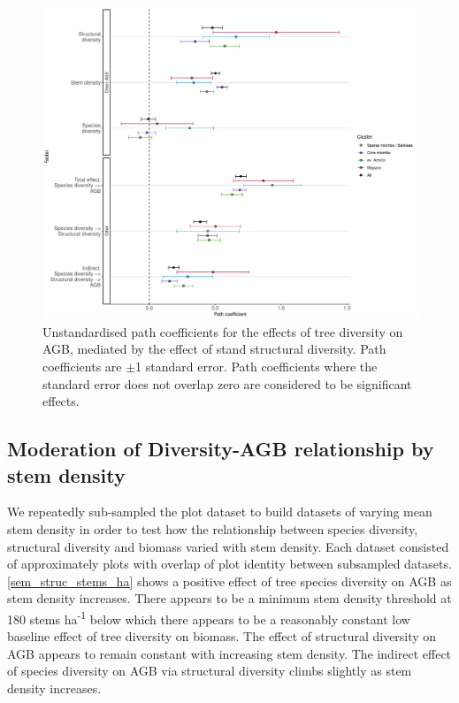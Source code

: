 \documentclass[11pt,a4paper]{article}
\newcommand{\textapprox}{\raisebox{0.5ex}{\texttildelow}}  %
\begin{document}
\begin{figure}[H]
\centering
	\includegraphics[width=\textwidth]{struc_model_slopes_all}
	\caption{Unstandardised path coefficients for the effects of tree diversity on AGB, mediated by the effect of stand structural diversity. Path coefficients are $\pm$1 standard error. Path coefficients where the standard error does not overlap zero are considered to be significant effects.}
	\label{struc_model_slopes_all}
\end{figure}



\subsection*{Moderation of Diversity-AGB relationship by stem density}

We repeatedly sub-sampled the plot dataset to build \subn{} datasets of varying mean stem density in order to test how the relationship between species diversity, structural diversity and biomass varied with stem density. Each dataset consisted of approximately \subp{} plots with overlap of plot identity between subsampled datasets.  \autoref{sem_struc_stems_ha} shows a positive effect of tree species diversity on AGB as stem density increases. There appears to be a minimum stem density threshold at \textapprox{}180 stems ha\textsuperscript{-1} below which there appears to be a reasonably constant low baseline effect of tree diversity on biomass. The effect of structural diversity on AGB appears to remain constant with increasing stem density. The indirect effect of species diversity on AGB via structural diversity climbs slightly as stem density increases.
\end{document}
